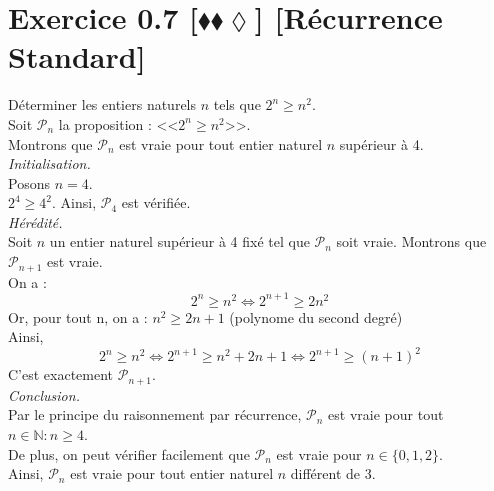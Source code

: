 \documentclass[10pt]{article}
\begin{document}
\section*{Exercice 0.7 [$\blacklozenge\blacklozenge\lozenge$] [Récurrence Standard]}
\begin{tcolorbox}[enhanced, width=6in, center, size=fbox, fontupper=\large, drop shadow southwest]
    Déterminer les entiers naturels $n$ tels que $2^n\geq n^2$.\\
    Soit $\mathcal{P}_n$ la proposition : <<$2^n\geq n^2$>>.\\
    Montrons que $\mathcal{P}_n$ est vraie pour tout entier naturel $n$ supérieur à 4.\\[0.5cm]
    \emph{Initialisation.}\\
    Posons $n=4$.\\
    $2^4 \geq 4^2$. Ainsi, $\mathcal{P}_4$ est vérifiée.\\[0.5cm]
    \emph{Hérédité.}\\
    Soit $n$ un entier naturel supérieur à 4 fixé tel que $\mathcal{P}_n$ soit vraie. Montrons que $\mathcal{P}_{n+1}$ est vraie.\\
    On a :
    \begin{equation*}
        2^n \geq n^2 \iff 2^{n+1} \geq 2n^2
    \end{equation*}
    Or, pour tout n, on a : $n^2 \geq 2n + 1$ (polynome du second degré)\\
    Ainsi,
    \begin{equation*}
        2^n \geq n^2 \iff 2^{n+1} \geq n^2 + 2n + 1 \iff 2^{n+1} \geq (n+1)^2
    \end{equation*}
    C'est exactement $\mathcal{P}_{n+1}$.\\[0.5cm]
    \emph{Conclusion.}\\
    Par le principe du raisonnement par récurrence, $\mathcal{P}_n$ est vraie pour tout $n\in\mathbb{N} : n\geq4$.\\
    De plus, on peut vérifier facilement que $\mathcal{P}_n$ est vraie pour $n\in\{0,1,2\}$.\\
    Ainsi, $\mathcal{P}_n$ est vraie pour tout entier naturel $n$ différent de 3.
\end{tcolorbox}
\end{document}
